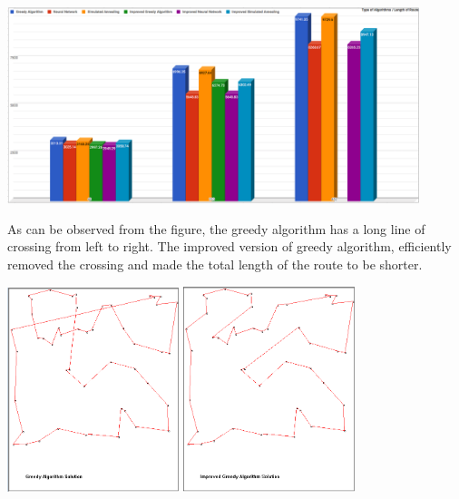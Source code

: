 \documentclass[12pt]{article}
\begin{document}
	\begin{center}
            \includegraphics[width=12cm]{RouteLength.png}
		\end{center}  

As can be observed from the figure, the greedy algorithm has a long line of crossing from left to right. The improved version of greedy algorithm, efficiently removed the crossing and made the total length of the route to be shorter.

\begin{center}
\includegraphics[width=5cm]{Greedy48.png}
\includegraphics[width=5cm]{ImprovedGreedy48.PNG}
\end{center}
\end{document}
